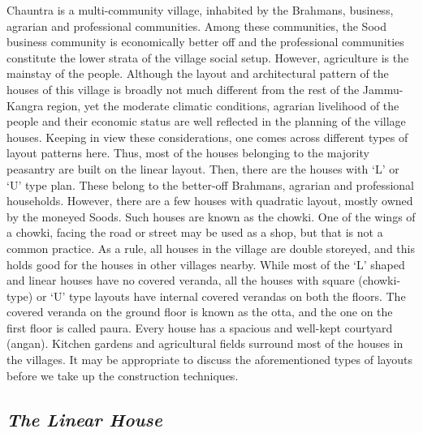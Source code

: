 Chauntra is a multi-community village, inhabited by the Brahmans, business, agrarian and professional communities. Among these communities, the Sood business community is economically better off and the professional communities constitute the lower strata of the village social setup. However, agriculture is the mainstay of the people. Although the layout and architectural pattern of the houses of this village is broadly not much different from the rest of the Jammu-Kangra region, yet the moderate climatic conditions, agrarian livelihood of the people and their economic status are well reflected in the planning of the village houses. Keeping in view these considerations, one comes across different types of layout patterns here. Thus, most of the houses belonging to the majority peasantry are built on the linear layout. Then, there are the houses with ‘L’ or ‘U’ type plan. These belong to the better-off Brahmans, agrarian and professional households. However, there are a few houses with quadratic layout, mostly owned by the moneyed Soods. Such houses are known as the chowki. One of the wings of a chowki, facing the road or street may be used as a shop, but that is not a common practice. As a rule, all houses in the village are double storeyed, and this holds good for the houses in other villages nearby. While most of the ‘L’ shaped and linear houses have no covered veranda, all the houses with square (chowki-type) or ‘U’ type layouts have internal covered verandas on both the floors. The covered veranda on the ground floor is known as the otta, and the one on the first floor is called paura. Every house has a spacious and well-kept courtyard (angan). Kitchen gardens and agricultural fields surround most of the houses in the villages. It may be appropriate to discuss the aforementioned types of layouts before we take up the construction techniques.


\subsection*{\textit{The Linear House}}


